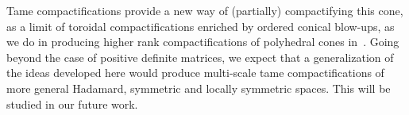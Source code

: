\documentclass[AHL,Unicode,longabstracts]{cedram}
\begin{document}
Tame compactifications provide a new way of (partially) compactifying this cone, as a limit of toroidal compactifications enriched by ordered conical blow-ups, as we do in producing higher rank compactifications of polyhedral cones in~\cite{AN2}. Going beyond the case of positive definite matrices, we expect that a generalization of the ideas developed here would produce multi-scale tame compactifications of more general Hadamard, symmetric and locally symmetric spaces. This will be studied in our future work.



\end{document}

